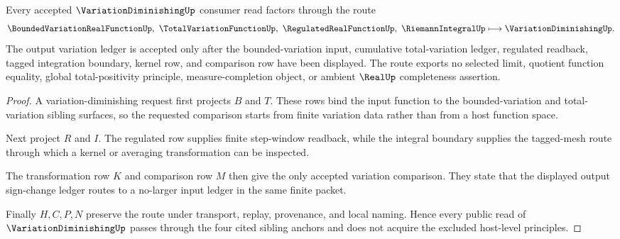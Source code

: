 \begin{theorem}
\label{thm:variation-diminishing-total-variation-route}
Every accepted $\VariationDiminishingUp$ consumer read factors through the route
$$
\BoundedVariationRealFunctionUp,\ \TotalVariationFunctionUp,\ \RegulatedRealFunctionUp,\ \RiemannIntegralUp
\longmapsto
\VariationDiminishingUp .
$$
The output variation ledger is accepted only after the bounded-variation input, cumulative total-variation ledger, regulated readback, tagged integration boundary, kernel row, and comparison row have been displayed. The route exports no selected limit, quotient function equality, global total-positivity principle, measure-completion object, or ambient $\RealUp$ completeness assertion.
\end{theorem}
\begin{proof}
A variation-diminishing request first projects $B$ and $T$. These rows bind the input function to the bounded-variation and total-variation sibling surfaces, so the requested comparison starts from finite variation data rather than from a host function space.

Next project $R$ and $I$. The regulated row supplies finite step-window readback, while the integral boundary supplies the tagged-mesh route through which a kernel or averaging transformation can be inspected.

The transformation row $K$ and comparison row $M$ then give the only accepted variation comparison. They state that the displayed output sign-change ledger routes to a no-larger input ledger in the same finite packet.

Finally $H,C,P,N$ preserve the route under transport, replay, provenance, and local naming. Hence every public read of $\VariationDiminishingUp$ passes through the four cited sibling anchors and does not acquire the excluded host-level principles.
\end{proof}



